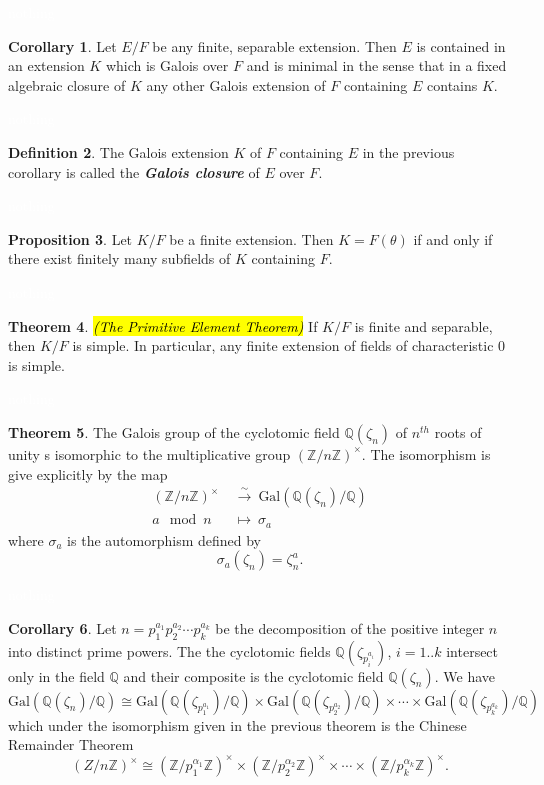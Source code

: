 \documentclass{article}
\theoremstyle{definition}
\newtheorem{thm}{Theorem}[section]
\newtheorem{prop}[thm]{Proposition}
\newtheorem{cor}[thm]{Corollary}
\newtheorem{defn}[thm]{Definition}
\newcommand{\nl}{\textcolor{white}{nothing}}
\newcommand{\Q}{\mathbb{Q}}
\newcommand{\Z}{\mathbb{Z}}
\newcommand{\al}{\alpha}
\newcommand{\sig}{\sigma}
\newcommand{\tht}{\theta}
\newcommand{\Gal}{\text{Gal}}
\begin{document}
\nl

\begin{cor}
Let $E/F$ be any finite, separable extension. Then $E$ is contained in an extension $K$ which is Galois over $F$ and is minimal in the sense that in a fixed algebraic closure of $K$ any other Galois extension of $F$ containing $E$ contains $K$.
\end{cor}

\nl

\begin{defn}
The Galois extension $K$ of $F$ containing $E$ in the previous corollary is called the \textit{\textbf{Galois closure}} of $E$ over $F$.
\end{defn}

\nl

\begin{prop}
Let $K/F$ be a finite extension. Then $K = F(\tht)$ if and only if there exist finitely many subfields of $K$ containing $F$.
\end{prop}

\nl

\begin{thm}\hl{\textit{(The Primitive Element Theorem)}} If $K/F$ is finite and separable, then $K/F$ is simple. In particular, any finite extension of fields of characteristic 0 is simple.
\end{thm}

\nl

\begin{thm}
The Galois group of the cyclotomic field $\Q(\zeta_n)$ of $n^{th}$ roots of unity s isomorphic to the multiplicative group $(\Z/n\Z)^\times$. The isomorphism is give explicitly by the map
\begin{align*}
(\Z/n\Z)^\times\  &\overset{\sim}{\longrightarrow}\ \Gal(\Q(\zeta_n)/\Q)\\
a\mod n\  &\longmapsto\  \sig_a
\end{align*}
where $\sig_a$ is the automorphism defined by 
\[\sig_a(\zeta_n) = \zeta_n^a.\]
\end{thm}

\nl

\begin{cor}
Let $n = p_1^{a_1}p_2^{a_2}\cdots p_k^{a_k}$ be the decomposition of the positive integer $n$ into distinct prime powers. The the cyclotomic fields $\Q(\zeta_{p_i^{a_i}})$, $i = 1..k$ intersect only in the field $\Q$ and their composite is the cyclotomic field $\Q(\zeta_n)$. We have
\[\Gal(\Q(\zeta_n)/\Q)\cong \Gal(\Q(\zeta_{p_1^{a_1}})/\Q) \times \Gal(\Q(\zeta_{p_2^{a_2}})/\Q) \times \cdots \times \Gal(\Q(\zeta_{p_k^{a_k}})/\Q)\]
which under the isomorphism given in the previous theorem is the Chinese Remainder Theorem
\[(Z/n\Z)^\times \cong (\Z/p_1^{\al_1}\Z)^\times\times(\Z/p_2^{\al_2}\Z)^\times\times\cdots\times (\Z/p_k^{\al_k}\Z)^\times.\]
\end{cor}
\end{document}

